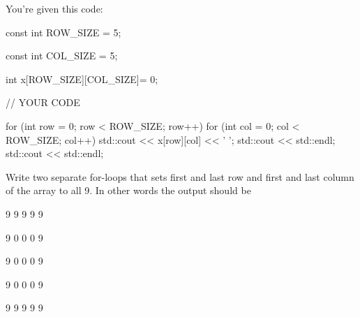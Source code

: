 \begin{ex}
You're given this code:

\begin{consolethree}
const int ROW_SIZE = 5;

const int COL_SIZE = 5;

int x[ROW_SIZE][COL_SIZE]= {{0}};

// YOUR CODE

for (int row = 0; row < ROW_SIZE; row++)
{
     for (int col = 0; col < ROW_SIZE; col++)
     {
          std::cout << x[row][col] << ' ';
     } 
     std::cout << std::endl;
}
std::cout << std::endl;
\end{consolethree}

Write two separate for-loops that sets first and last row and first and last column of the array to all 9. In other words the output should be

\begin{consolethree}
9 9 9 9 9

9 0 0 0 9

9 0 0 0 9

9 0 0 0 9

9 9 9 9 9
\end{consolethree}
\end{ex}
